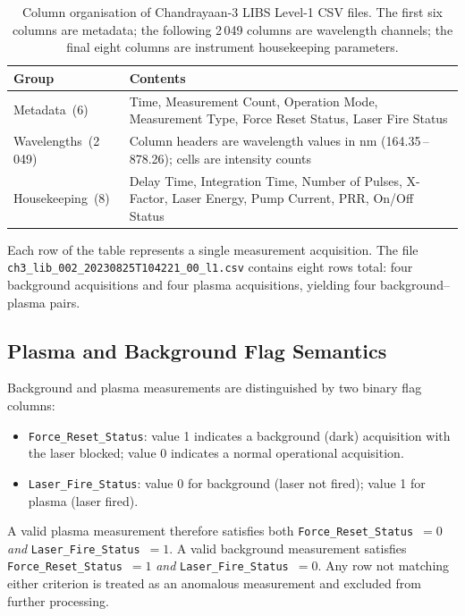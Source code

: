 \documentclass[a4paper,twocolumn,10pt]{article}
\begin{document}
\begin{table}[htbp]
\centering
\caption{Column organisation of Chandrayaan-3 LIBS Level-1 CSV files.
  The first six columns are metadata; the following 2\,049 columns are
  wavelength channels; the final eight columns are instrument
  housekeeping parameters.}
\label{tab:l1_schema}
{\small
\begin{tabularx}{\columnwidth}{@{}lX@{}}
\toprule
\textbf{Group} & \textbf{Contents} \\
\midrule
Metadata~(6) & Time, Measurement Count, Operation Mode,
  Measurement Type, Force Reset Status, Laser Fire Status \\
\addlinespace
Wavelengths~(2\,049) & Column headers are wavelength values
  in nm (164.35\,--\,878.26); cells are intensity counts \\
\addlinespace
Housekeeping~(8) & Delay Time, Integration Time,
  Number of Pulses, X-Factor, Laser Energy,
  Pump Current, PRR, On/Off Status \\
\bottomrule
\end{tabularx}
}
\end{table}

Each row of the table represents a single measurement acquisition.
The file \texttt{ch3\_lib\_002\_20230825T104221\_00\_l1.csv} contains
eight rows total: four background acquisitions and four plasma
acquisitions, yielding four background--plasma pairs.

\subsection{Plasma and Background Flag Semantics}

Background and plasma measurements are distinguished by two binary
flag columns:
\begin{itemize}[nosep,leftmargin=*]
  \item \texttt{Force\_Reset\_Status}: value 1 indicates a background
    (dark) acquisition with the laser blocked; value 0 indicates a
    normal operational acquisition.
  \item \texttt{Laser\_Fire\_Status}: value 0 for background (laser not
    fired); value 1 for plasma (laser fired).
\end{itemize}

A valid plasma measurement therefore satisfies both
\texttt{Force\_Reset\_Status}~$=0$ \emph{and}
\texttt{Laser\_Fire\_Status}~$=1$.  A valid background measurement
satisfies \texttt{Force\_Reset\_Status}~$=1$ \emph{and}
\texttt{Laser\_Fire\_Status}~$=0$.  Any row not matching either
criterion is treated as an anomalous measurement and excluded from
further processing.
\end{document}
